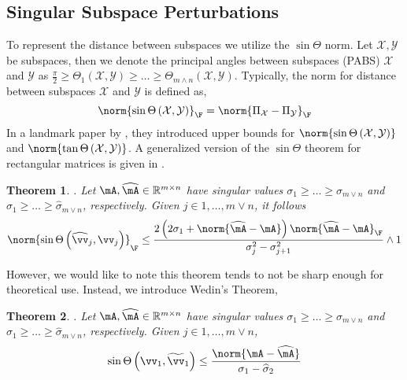\documentclass[10pt]{article}
\theoremstyle{plain}
\newtheorem{theorem}{Theorem}
\theoremstyle{definition}
\theoremstyle{remark}
\begin{document}
\subsection{Singular Subspace Perturbations}
To represent the distance between subspaces we utilize the $\sin \Theta$ norm. Let $\mathcal{X}, \mathcal{Y}$ be subspaces, then we denote the principal angles between subspaces (PABS) $\mathcal{X}$ and $\mathcal{Y}$ as $\frac{\pi}{2} \geq \Theta_1(\mathcal{X}, \mathcal{Y}) \geq \ldots \geq \Theta_{m \land n}(\mathcal{X}, \mathcal{Y})$.
Typically, the norm for distance between subspaces $\mathcal{X}$ and $\mathcal{Y}$ is defined as, 
\begin{equation}
	\norm{\sin\Theta\left(\mathcal{X},\mathcal{Y}\right)}_{\F} = \norm{\Pi_{\mathcal{X}} - \Pi_{\mathcal{Y}}}_{\F}
\end{equation} 
In a landmark paper by \cite{davis:1970}, they introduced upper bounds for $\norm{\sin\Theta\left(\mathcal{X},\mathcal{Y}\right)}$ and $\norm{\tan\Theta\left(\mathcal{X},\mathcal{Y}\right)}$. 
A generalized version of the $\sin\Theta$ theorem for rectangular matrices is given in \cite{yu:2015}. 
\begin{theorem} \label{thm:generalized-wedin}
	\cite{yu:2015}. Let $\mA,\widehat{\mA} \in \mathbb{R}^{m \times n}$ have singular values $\sigma_1 \geq \ldots \geq \sigma_{m \lor n}$ and $\widehat{\sigma}_1 \geq \ldots \geq \widehat{\sigma}_{m \lor n}$, respectively. Given $j \in 1,\ldots,m \lor n$, it follows
	\begin{equation}
		\norm{\sin \Theta\left(\widehat{\vv}_j,\vv_j\right)}_{\F} \leq \frac{2\left(2\sigma_1 + \norm{\widehat{\mA}- \mA}\right)\norm{\widehat{\mA}-\mA}_{\F}}{\sigma^2_j - \sigma^2_{j+1}} \land 1
	\end{equation}
\end{theorem}
However, we would like to note this theorem tends to not be sharp enough for theoretical use. Instead, we introduce Wedin's Theorem,
\begin{theorem}\label{thm:wedin}
	\cite{wedin:1972}. Let $\mA,\widehat{\mA} \in \mathbb{R}^{m \times n}$ have singular values $\sigma_1 \geq \ldots \geq \sigma_{m \lor n}$ and $\widehat{\sigma}_1 \geq \ldots \geq \widehat{\sigma}_{m \lor n}$, respectively. Given $j \in 1,\ldots,m \lor n$,
	\begin{equation}
		\sin\Theta\left(\vv_1,\widetilde{\vv}_1\right) \leq \frac{\norm{\mA - \widehat{\mA}}}{\sigma_1 - \widehat{\sigma}_2}
	\end{equation}
\end{theorem}
\end{document}
